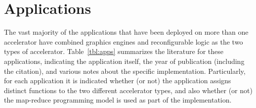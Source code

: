 \section{Applications}
\label{sec:apps}

The vast majority of the applications that have been deployed on
more than one accelerator have combined graphics engines and reconfigurable
logic as the two types of accelerator.
Table~\ref{tbl:apps} summarizes the literature for these applications,
indicating the application itself, the year of publication (including
the citation), and various notes about the specific implementation.
Particularly, for each application it is indicated whether (or not)
the application assigns distinct functions to the two different
accelerator types, and also whether (or not) the map-reduce programming
model is used as part of the implementation.


